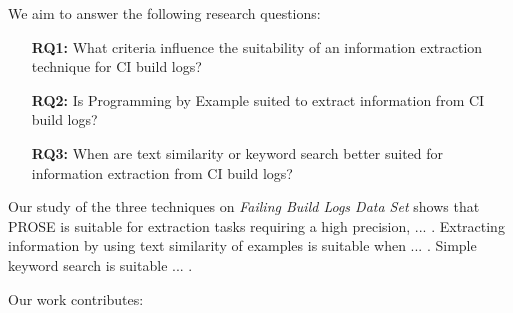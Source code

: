 \documentclass[\myrootdir/main.tex]{subfiles}
\begin{document}
We aim to answer the following research questions:

\begin{itemize}
  \item[\textbf{RQ1:}] What criteria influence the suitability of an information extraction technique for CI build logs?
  \item[\textbf{RQ2:}] Is Programming by Example suited to extract information from CI build logs?
  \item[\textbf{RQ3:}] When are text similarity or keyword search better suited for information extraction from CI build logs?
\end{itemize}

Our study of the three techniques on \emph{Failing Build Logs Data Set} shows that PROSE is suitable for extraction tasks requiring a high precision, ... . Extracting information by using text similarity of examples is suitable when ... . Simple keyword search is suitable ... .


Our work contributes:
\end{document}
